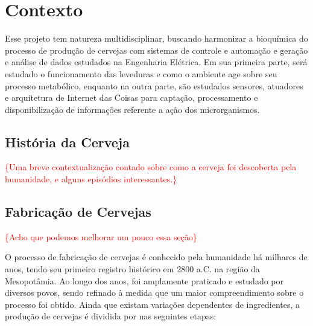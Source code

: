 \chapter{Contexto}

Esse projeto tem natureza multidisciplinar, buscando harmonizar a bioquímica do
processo de produção de cervejas com sistemas de controle e automação e
geração e análise de dados estudados na Engenharia Elétrica. Em sua primeira
parte, será estudado o funcionamento das leveduras e como o ambiente age sobre
seu processo metabólico, enquanto na outra parte, são estudados sensores,
atuadores e arquitetura de Internet das Coisas para captação, processamento e
disponibilização de informações referente a ação dos microrganismos.

\section{História da Cerveja}

\textcolor{red}{\{Uma breve contextualização contado sobre como a cerveja foi descoberta pela humanidade, e alguns episódios interessantes.\}}

\section{Fabricação de Cervejas}

\textcolor{red}{\{Acho que podemos melhorar um pouco essa seção\}}

O processo de fabricação de cervejas é conhecido pela 
humanidade há milhares de anos, tendo seu primeiro registro histórico em 2800 a.C.
na região da Mesopotâmia. Ao longo dos anos, foi amplamente praticado e estudado
por diversos povos, sendo refinado à medida que um maior compreendimento sobre
o processo foi obtido. Ainda que existam variações dependentes de ingredientes, a
produção de cervejas é dividida por  nas seguintes etapas: 


